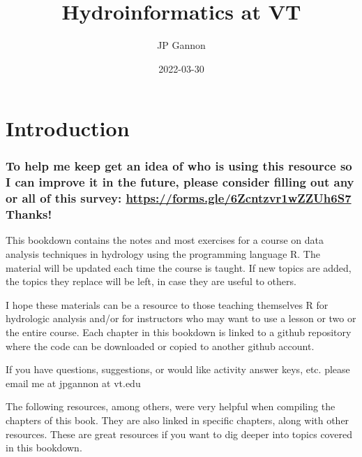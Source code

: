 \documentclass[
]{book}
\title{Hydroinformatics at VT}
\author{JP Gannon}
\date{2022-03-30}
\begin{document}
\maketitle

{
\setcounter{tocdepth}{1}
\tableofcontents
}
\hypertarget{introduction}{%
\chapter{Introduction}\label{introduction}}

\hypertarget{to-help-me-keep-get-an-idea-of-who-is-using-this-resource-so-i-can-improve-it-in-the-future-please-consider-filling-out-any-or-all-of-this-survey-httpsforms.gle6zcntzvr1wzzuh6s7-thanks}{%
\subsection{\texorpdfstring{To help me keep get an idea of who is using this resource so I can improve it in the future, please consider filling out any or all of this survey: \url{https://forms.gle/6Zcntzvr1wZZUh6S7} Thanks!}{To help me keep get an idea of who is using this resource so I can improve it in the future, please consider filling out any or all of this survey: https://forms.gle/6Zcntzvr1wZZUh6S7 Thanks!}}\label{to-help-me-keep-get-an-idea-of-who-is-using-this-resource-so-i-can-improve-it-in-the-future-please-consider-filling-out-any-or-all-of-this-survey-httpsforms.gle6zcntzvr1wzzuh6s7-thanks}}

This bookdown contains the notes and most exercises for a course on data analysis techniques in hydrology using the programming language R. The material will be updated each time the course is taught. If new topics are added, the topics they replace will be left, in case they are useful to others.

I hope these materials can be a resource to those teaching themselves R for hydrologic analysis and/or for instructors who may want to use a lesson or two or the entire course. Each chapter in this bookdown is linked to a github repository where the code can be downloaded or copied to another github account.

If you have questions, suggestions, or would like activity answer keys, etc. please email me at jpgannon at vt.edu

The following resources, among others, were very helpful when compiling the chapters of this book. They are also linked in specific chapters, along with other resources. These are great resources if you want to dig deeper into topics covered in this bookdown.
\end{document}
